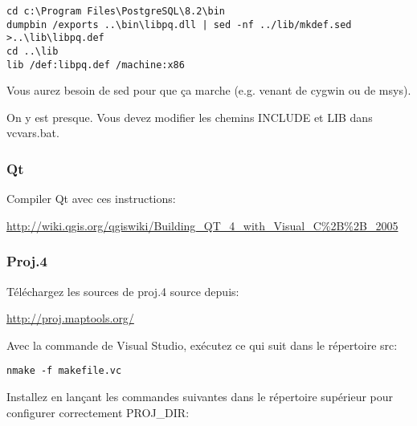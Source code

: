 \begin{verbatim}
cd c:\Program Files\PostgreSQL\8.2\bin
dumpbin /exports ..\bin\libpq.dll | sed -nf ../lib/mkdef.sed >..\lib\libpq.def
cd ..\lib
lib /def:libpq.def /machine:x86
\end{verbatim}

% 

Vous aurez besoin de sed pour que \c{c}a marche (e.g. venant de cygwin ou de msys).

On y est presque. Vous devez modifier les chemins INCLUDE et LIB dans vcvars.bat.

\subsubsection{Qt}
Compiler Qt avec ces instructions:

\url{
http://wiki.qgis.org/qgiswiki/Building\_QT\_4\_with\_Visual\_C\%2B\%2B\_2005}

% 
% 
% 
% 

\subsubsection{Proj.4}
T\'el\'echargez les sources de proj.4 source depuis:

\url{http://proj.maptools.org/}

Avec la commande de Visual Studio, ex\'ecutez ce qui suit dans le r\'epertoire src:

\begin{verbatim}
nmake -f makefile.vc
\end{verbatim}

Installez en lan\c{c}ant les commandes suivantes dans le r\'epertoire sup\'erieur pour configurer correctement PROJ\_DIR:

